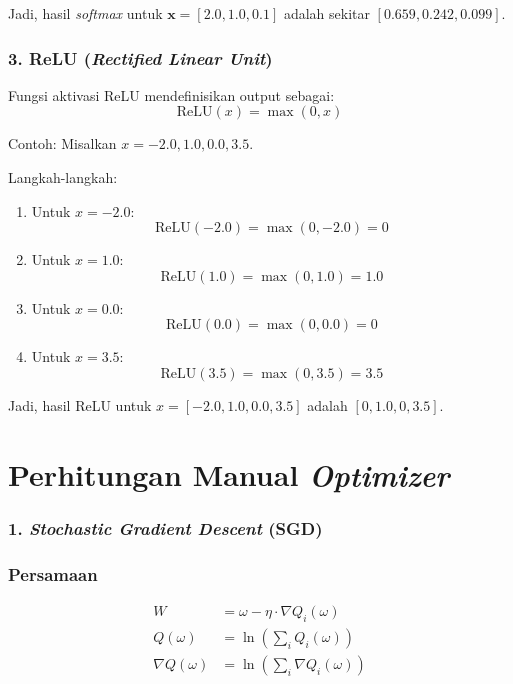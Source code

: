 Jadi, hasil \textit{softmax} untuk \(\mathbf{x} = [2.0, 1.0, 0.1]\) adalah sekitar \([0.659, 0.242, 0.099]\).

\subsection*{3. ReLU (\textit{Rectified Linear Unit})}
Fungsi aktivasi ReLU mendefinisikan output sebagai:
\[
\text{ReLU}(x) = \max(0, x)
\]

Contoh: Misalkan \( x = -2.0, 1.0, 0.0, 3.5 \).

Langkah-langkah:
\begin{enumerate}
    \item Untuk \( x = -2.0 \):
    \[
    \text{ReLU}(-2.0) = \max(0, -2.0) = 0
    \]

    \item Untuk \( x = 1.0 \):
    \[
    \text{ReLU}(1.0) = \max(0, 1.0) = 1.0
    \]

    \item Untuk \( x = 0.0 \):
    \[
    \text{ReLU}(0.0) = \max(0, 0.0) = 0
    \]

    \item Untuk \( x = 3.5 \):
    \[
    \text{ReLU}(3.5) = \max(0, 3.5) = 3.5
    \]
\end{enumerate}

Jadi, hasil ReLU untuk \( x = [-2.0, 1.0, 0.0, 3.5] \) adalah \([0, 1.0, 0, 3.5]\).



\chapter{Perhitungan Manual \textit{Optimizer}}
\label{Perhitungan Manual Optimizer}


\subsection*{1. \textit{Stochastic Gradient Descent} (SGD)}

\subsection*{Persamaan}
\begin{align}
    W & = \omega - \eta \cdot \nabla Q_i(\omega) \\
    Q(\omega) & = \ln\left(\sum_i Q_i(\omega)\right) \\
    \nabla Q(\omega) & = \ln\left(\sum_i \nabla Q_i(\omega)\right)
\end{align}



